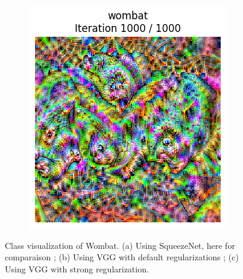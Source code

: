 \begin{figure}[H]
\begin{subfigure}{.32\textwidth}
        \caption{}
        \label{fig:class_viz_wombat_VGG:b}
    \end{subfigure}%
    \begin{subfigure}{.32\textwidth}
        \centering
        \includegraphics[width=\linewidth]{VGG/VGG_wombat_animated_1000_regpp_blur_last_frame.png}
        \caption{}
        \label{fig:class_viz_wombat_VGG:c}
    \end{subfigure}
    \caption{Class visualization of Wombat. (a) Using SqueezeNet, here for comparaison ; (b) Using VGG with default regularizations ; (c) Using VGG with strong regularization.}
    \label{fig:class_viz_wombat_VGG}
\end{figure}

